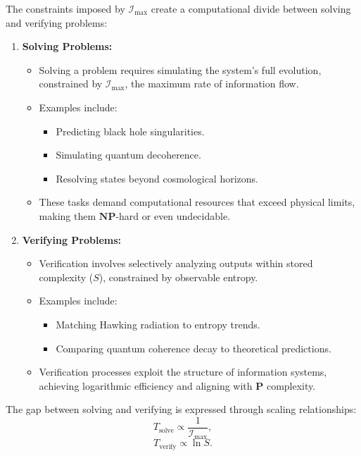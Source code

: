 \documentclass[12pt]{article}
\begin{document}
The constraints imposed by $\mathcal{I}_{\text{max}}$ create a computational divide between solving and verifying problems:
\begin{enumerate}
    \item \textbf{Solving Problems:}
    \begin{itemize}
        \item Solving a problem requires simulating the system’s full evolution, constrained by $\mathcal{I}_{\text{max}}$, the maximum rate of information flow.
        \item Examples include:
        \begin{itemize}
            \item Predicting black hole singularities.
            \item Simulating quantum decoherence.
            \item Resolving states beyond cosmological horizons.
        \end{itemize}
        \item These tasks demand computational resources that exceed physical limits, making them $\mathbf{NP}$-hard or even undecidable.
    \end{itemize}

    \item \textbf{Verifying Problems:}
    \begin{itemize}
        \item Verification involves selectively analyzing outputs within stored complexity ($S$), constrained by observable entropy.
        \item Examples include:
        \begin{itemize}
            \item Matching Hawking radiation to entropy trends.
            \item Comparing quantum coherence decay to theoretical predictions.
        \end{itemize}
        \item Verification processes exploit the structure of information systems, achieving logarithmic efficiency and aligning with $\mathbf{P}$ complexity.
    \end{itemize}
\end{enumerate}

The gap between solving and verifying is expressed through scaling relationships:
\[
T_{\text{solve}} \propto \frac{1}{\mathcal{I}_{\text{max}}},
\]
\[
T_{\text{verify}} \propto \ln S.
\]
\end{document}
